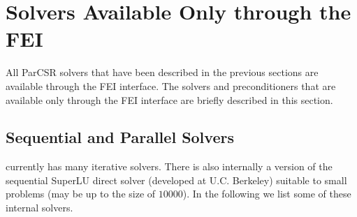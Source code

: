 \section{\hypre{} Solvers Available Only through the FEI} 

All ParCSR solvers that have been described in the previous
sections are available through the FEI interface.
The solvers and preconditioners that are available 
only through the FEI interface are briefly described in this section.

%
%
\subsection{Sequential and Parallel Solvers} 

\hypre{} currently has many iterative solvers. There is also internally a
version of the sequential {\sf SuperLU} direct solver (developed at U.C.
Berkeley) suitable to small problems (may be up to the size of $10000$).
In the following we list some of these internal solvers.

